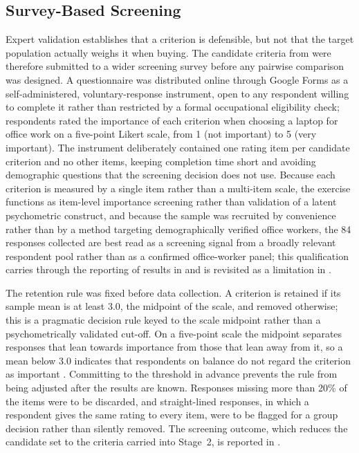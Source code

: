 \subsection{Survey-Based Screening}\label{subsec:screening}

Expert validation establishes that a criterion is defensible, but not that the target
population actually weighs it when buying. The candidate criteria from
 were therefore submitted to a wider screening survey
before any pairwise comparison was designed. A questionnaire was distributed online
through Google Forms as a self-administered, voluntary-response instrument, open to any
respondent willing to complete it rather than restricted by a formal occupational
eligibility check; respondents rated the importance of each criterion when choosing a
laptop for office work on a five-point Likert scale, from 1 (not important) to 5 (very
important). The instrument deliberately contained one rating item per candidate criterion
and no other items, keeping completion time short and avoiding demographic questions that
the screening decision does not use. Because each criterion is measured by a single item
rather than a multi-item scale, the exercise functions as item-level importance screening
rather than validation of a latent psychometric construct, and because the sample was
recruited by convenience rather than by a method targeting demographically verified office
workers, the 84 responses collected are best read as a screening signal from a broadly
relevant respondent pool rather than as a confirmed office-worker panel; this qualification
carries through the reporting of results in  and is revisited as a
limitation in .

The retention rule was fixed before data collection. A criterion is retained if its sample
mean is at least 3.0, the midpoint of the scale, and removed otherwise; this is a pragmatic
decision rule keyed to the scale midpoint rather than a psychometrically validated
cut-off. On a five-point scale the midpoint separates responses that lean towards
importance from those that lean away from it, so a mean below 3.0 indicates that
respondents on balance do not regard the criterion as important
\parencite{chyung_evidencebased_2017}. Committing to the threshold in advance prevents the
rule from being adjusted after the results are known. Responses missing more than 20\% of
the items were to be discarded, and straight-lined responses, in which a respondent gives
the same rating to every item, were to be flagged for a group decision rather than
silently removed. The screening outcome, which reduces the candidate set to the criteria
carried into Stage~2, is reported in .

